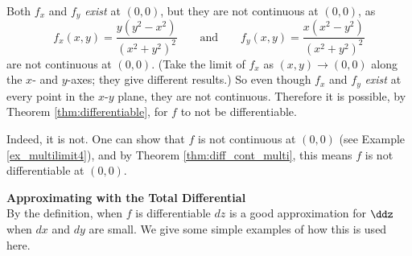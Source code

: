 Both $f_x$ and $f_y$ \textit{exist} at $(0,0)$, but they are not continuous at $(0,0)$, as 
$$f_x(x,y) = \frac{y(y^2-x^2)}{(x^2+y^2)^2} \qquad \text{and}\qquad f_y(x,y) = \frac{x(x^2-y^2)}{(x^2+y^2)^2} $$ are not continuous at $(0,0)$. (Take the limit of $f_x$ as $(x,y)\to(0,0)$ along the $x$- and $y$-axes; they give different results.) So even though $f_x$ and $f_y$ \textit{exist} at every point in the $x$-$y$ plane, they are not continuous. Therefore it is possible, by Theorem \ref{thm:differentiable}, for $f$ to not be differentiable.

 Indeed, it is not. One can show that $f$ is not continuous at $(0,0)$ (see Example \ref{ex_multilimit4}), and by Theorem \ref{thm:diff_cont_multi}, this means $f$ is not differentiable at $(0,0)$.\\
														
\pagebreak

\noindent\textbf{\large Approximating with the Total Differential}\\

By the definition, when $f$ is differentiable $dz$ is a good approximation for $\ddz$ when $dx$ and $dy$ are small. We give some simple examples of how this is used here.\\

